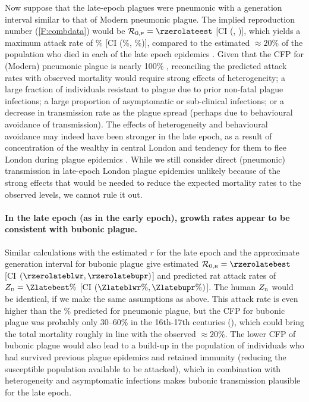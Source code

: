 Now suppose that the late-epoch plagues were pneumonic with a generation interval similar to that of Modern pneumonic plague.  The implied reproduction number (\cref{F:combdata}) would be $\rzerop=\rzerolateest$ [CI (\rzerolatelwr, \rzerolateupr)],
which yields a maximum attack rate of \Zlateest\%  [CI (\Zlatelwr\%, \Zlateupr\%)], compared to 
the estimated $\approx 20\%$ of the population
who died in each of the late epoch epidemics \cite[p.\,4]{Cumm+16}.
Given that the CFP for (Modern) pneumonic plague is nearly 100\%
\cite{KoolWein05,WHOplaguePage,WHOplagueFactSheet,CDCplagueEmergencyFAQ},
reconciling the predicted attack rates with observed mortality would require strong effects of heterogeneity; a large fraction of individuals resistant to plague due to prior non-fatal plague infections; a large proportion of asymptomatic or sub-clinical infections; or a decrease in transmission rate as the plague spread (perhaps due to behavioural avoidance of transmission).
The effects of heterogeneity and behavioural avoidance may indeed have been stronger in the late epoch, as a result of concentration of the wealthy in central London and tendency for them to flee London during plague epidemics \cite[p.\,4]{Cumm+16}. While we still consider direct (pneumonic) transmission in  late-epoch London plague epidemics unlikely because of the strong effects that would be needed to reduce the expected mortality rates to the observed levels, we cannot rule it out.

\paragraph{In the late epoch (as in the early epoch), growth rates appear to be consistent with bubonic plague.}

Similar calculations with the estimated $r$ for the late epoch and the
approximate generation interval for bubonic plague give estimated $\rzerob=\rzerolatebest$ [CI $(\rzerolateblwr, \rzerolatebupr)$] and predicted rat attack rates of $\Zb=\Zlatebest\%$ [CI $(\Zlateblwr\%, \Zlatebupr\%)$]. The human $Z_{\mbox{\tiny B}}$ would be identical, if we make the same assumptions as above. This attack rate is even higher than the \Zlateest\% predicted for pneumonic plague, but the CFP for bubonic plague was probably only 30--60\% in the 16th-17th centuries (\eg \cite{Ligo06,WHOplagueFactSheet}), which could bring the total mortality roughly in line with the observed $\approx 20\%$. The lower CFP of bubonic plague would also lead to a build-up in the population of individuals who had survived previous plague epidemics and retained immunity (reducing the susceptible population available to be attacked), which in combination with heterogeneity and asymptomatic infections makes bubonic transmission plausible for the late epoch.

